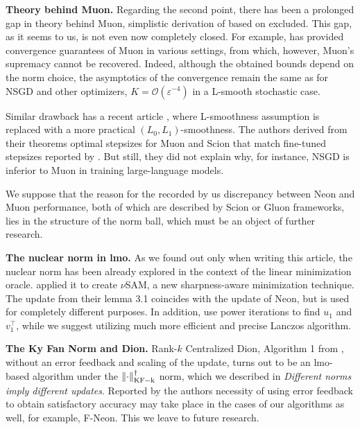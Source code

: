 \documentclass{article} %
\renewcommand{\epsilon}{\varepsilon}
\newcommand{\cO}{\mathcal{O}}
\DeclarePairedDelimiter{\normkfk}{\|}{\|_\mathrm{KF-k}}
\begin{document}
{\bf Theory behind Muon.} Regarding the second point, there has been a prolonged gap in theory behind Muon, simplistic derivation of \cite{bernstein2025deriving} based on \cite{bernstein2024oldoptimizernewnorm} excluded. This gap, as it seems to us, is not even now completely closed. For example, \cite{kovalev2025understanding} has provided convergence guarantees of Muon in various settings, from which, however, Muon's supremacy cannot be recovered. Indeed, although the obtained bounds depend on the norm choice, the asymptotics of the convergence remain the same as for NSGD and other optimizers, $K = \cO(\epsilon^{-4})$ in a L-smooth stochastic case.

Similar drawback has a recent article \cite{riabinin2025gluon}, where L-smoothness assumption is replaced with a more practical $(L_0, L_1)$-smoothness. The authors derived from their theorems optimal stepsizes for Muon and Scion that match fine-tuned stepsizes reported by \cite{pethick2025training}. But still, they did not explain why, for instance, NSGD is inferior to Muon in training large-language models.

We suppose that the reason for the recorded by us discrepancy between Neon and Muon performance, both of which are described by Scion or Gluon frameworks, lies in the structure of the norm ball, which must be an object of further research.

{\bf The nuclear norm in lmo.} As we found out only when writing this article, the nuclear norm has been already explored in the context of the linear minimization oracle. \cite{pethick2025sam} applied it to create $\nu$SAM, a new sharpness-aware minimization technique. The update from their lemma 3.1 coincides with the update of Neon, but is used for completely different purposes. In addition, \cite{pethick2025sam} use power iterations to find $u_1$ and $v_1^\top$, while we suggest utilizing much more efficient and precise Lanczos algorithm.

{\bf The Ky Fan Norm and Dion.} Rank-$k$ Centralized Dion, Algorithm 1 from \cite{ahn2025dioncommunicationefficientoptimizerlarge}, without an error feedback and scaling of the update, turns out to be an lmo-based algorithm under the $\normkfk{\cdot}^\dagger$ norm, which we described in {\it Different norms imply different updates}. Reported by the authors necessity of using error feedback to obtain satisfactory accuracy may take place in the cases of our algorithms as well, for example, F-Neon. This we leave to future research.
\end{document}
